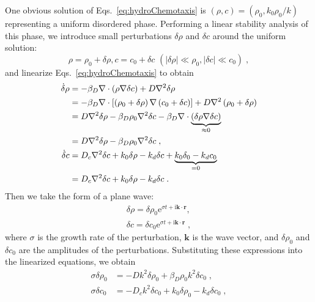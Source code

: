 \documentclass[a4paper, amsfonts, amssymb, amsmath, reprint, showkeys, showpacs, nofootinbib, twoside]{revtex4-2}
\begin{document}
One obvious solution of Eqs.~\eqref{eq:hydroChemotaxis} is $(\rho, c)=(\rho_0, k_0\rho_0/k)$ representing a uniform disordered phase. Performing a linear stability analysis of this phase, we introduce small perturbations $\delta \rho$ and $\delta c$ around the uniform solution:
\begin{equation}
    \rho =\rho _0+\delta \rho , c=c_0+\delta c\,\,\left( \left| \delta \rho \right|\ll \rho _0, \left| \delta c \right|\ll c_0 \right) \;,
\end{equation}
and linearize Eqs.~\eqref{eq:hydroChemotaxis} to obtain
\begin{subequations}
    \begin{align}
        \dot{\delta}\rho &=-\beta _D\nabla \cdot \left( \rho \nabla \delta c \right) +D\nabla ^2\delta \rho\notag \\
        &=-\beta _D\nabla \cdot \left[ \left( \rho _0+\delta \rho \right) \nabla \left( c_0+\delta c \right) \right] +D\nabla ^2\left( \rho _0+\delta \rho \right)\notag \\
        &=D\nabla ^2\delta \rho -\beta _D\rho _0\nabla ^2\delta c-\beta _D\nabla \cdot \underset{\approx 0}{\underbrace{\left( \delta \rho \nabla \delta c \right) }}\notag \\
        &=D\nabla ^2\delta \rho -\beta _D\rho _0\nabla ^2\delta c \;,\\
        \dot{\delta}c&=D_c\nabla ^2\delta c+k_0\delta \rho -k_d\delta c+\underset{=0}{\underbrace{k_0\delta _0-k_dc_0}}\notag \\
        &=D_c\nabla ^2\delta c+k_0\delta \rho -k_d\delta c \;.
    \end{align}
\end{subequations}
Then we take the form of a plane wave:
\begin{subequations}
    \begin{align}
        \delta \rho =\delta \rho _0\mathrm{e}^{\sigma t+\mathrm{i}\mathbf{k}\cdot \mathbf{r}}, 
        \\
        \delta c=\delta c_0\mathrm{e}^{\sigma t+\mathrm{i}\mathbf{k}\cdot \mathbf{r}}\;,
    \end{align}
\end{subequations}
where $\sigma$ is the growth rate of the perturbation, $\mathbf{k}$ is the wave vector, and $\delta \rho _0$ and $\delta c_0$ are the amplitudes of the perturbations. Substituting these expressions into the linearized equations, we obtain
\begin{subequations}
    \begin{align}
        \sigma \delta \rho _0&=-Dk^2\delta \rho _0+\beta _D\rho _0k^2\delta c_0\;,\\
        \sigma \delta c_0&=-D_ck^2\delta c_0+k_0\delta \rho _0-k_d\delta c_0\;,
    \end{align}
    \label{eq:linearStability}
\end{subequations}
\end{document}
